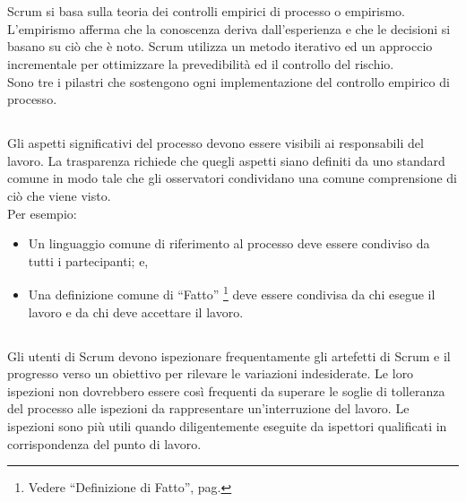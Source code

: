 
\section*{\color{Blue}{La Teoria di Scrum}}%
\label{sec:scrum_theory}
Scrum si basa sulla teoria dei controlli empirici di processo o empirismo. L'empirismo afferma che la conoscenza deriva 
dall'esperienza e che le decisioni si basano su ci\`o che \`e noto. Scrum utilizza un metodo iterativo ed un approccio 
incrementale per ottimizzare la prevedibilit\`a ed il controllo del rischio. 
\newline
\\Sono tre i pilastri che sostengono ogni implementazione del controllo empirico di processo.

\subsection*{\color{SteelBlue}{Trasparenza}}%
\label{sec:transparency}
Gli aspetti significativi  del processo devono essere visibili ai responsabili del lavoro. La trasparenza richiede che quegli 
aspetti siano definiti da uno standard comune in modo tale che gli osservatori condividano una comune comprensione di ci\`o che 
viene visto.
\newline
\\Per esempio:
\begin{itemize}
	\item Un linguaggio comune di riferimento al processo deve essere condiviso da tutti i partecipanti; e,
	\item Una definizione comune di ``Fatto'' \footnote[1]{Vedere ``Definizione di Fatto'', pag. 
	      \pageref{sec:definition_of_done}} deve essere condivisa da chi esegue il lavoro e da chi deve accettare il lavoro.
\end{itemize}

\subsection*{\color{SteelBlue}{Ispezione}}%
\label{sec:inspection}
Gli utenti di Scrum devono ispezionare frequentamente gli artefetti di Scrum e il progresso verso un obiettivo per rilevare le 
variazioni indesiderate. Le loro ispezioni non dovrebbero essere cos\`i frequenti da superare le soglie di tolleranza del 
processo alle ispezioni da rappresentare un'interruzione del lavoro. Le ispezioni sono pi\`u utili quando diligentemente 
eseguite da ispettori qualificati in corrispondenza del punto di lavoro.

